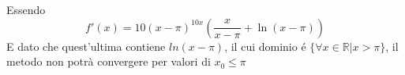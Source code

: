 

Essendo \[f'(x)=10(x-\pi)^{10x}(\frac{x}{x-\pi}+\ln{(x-\pi)})\]
E dato che quest'ultima contiene $ln(x - \pi)$, il cui dominio \'e \( \{ \forall x \in \mathbb{R} | x > \pi \}\), il metodo non potrà convergere per valori di $x_0 \leq \pi$
